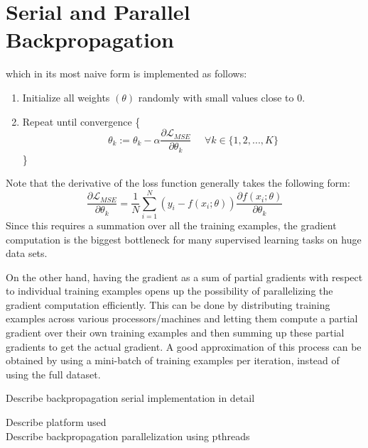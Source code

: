 \section{Serial and Parallel Backpropagation}
\label{BackProp}

which in its most naive form is implemented as follows:
\begin{enumerate}
\item Initialize all weights $(\theta)$ randomly with small values close to 0.
\item Repeat until convergence \{
\begin{equation*}
\theta_k := \theta_k - \alpha \frac{\partial \mathcal{L}_{MSE}}{\partial \theta_k} \hspace{16pt} \forall k \in \{1,2,...,K\}
\end{equation*}
\}
\end{enumerate}
Note that the derivative of the loss function generally takes the following form:
\begin{equation*}
\frac{\partial \mathcal{L}_{MSE}}{\partial \theta_k} = \frac{1}{N} \sum_{i=1}^N ( y_i - f(x_i; \theta)) \frac{\partial f(x_i; \theta)}{\partial \theta_k}
\end{equation*}
Since this requires a summation over all the training examples, the gradient computation is the biggest bottleneck for many supervised learning tasks on huge data sets.

On the other hand, having the gradient as a sum of partial gradients with respect to individual training examples opens up the possibility of parallelizing the gradient computation efficiently.
This can be done by distributing training examples across various processors/machines and letting them compute a partial gradient over their own training examples and then summing up these partial gradients to get the actual gradient.
A good approximation of this process can be obtained by using a mini-batch of training examples per iteration, instead of using the full dataset.

Describe backpropagation serial implementation in detail

Describe platform used \\
Describe backpropagation parallelization using pthreads
